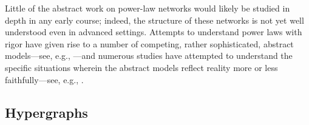 \noindent {}
\bigskip

Little of the abstract work on power-law networks would likely be
studied in depth in any early course; indeed, the structure of these
networks is not yet well understood even in advanced settings.
Attempts to understand power laws with rigor have given rise to a
number of competing, rather sophisticated, abstract models---see,
e.g., \cite{AielloCL00,BarabasiA99,Bollobas85,ChenCGJSW}---and
numerous studies have attempted to understand the specific situations
wherein the abstract models reflect reality more or less
faithfully---see, e.g.,
\cite{BuT02,FaloutsosFF99,JaiswalRT04,TangmunarunkitGJSW02,ZeguraCD97}.


\subsection{Hypergraphs}
\label{sec:hypergraphs}

